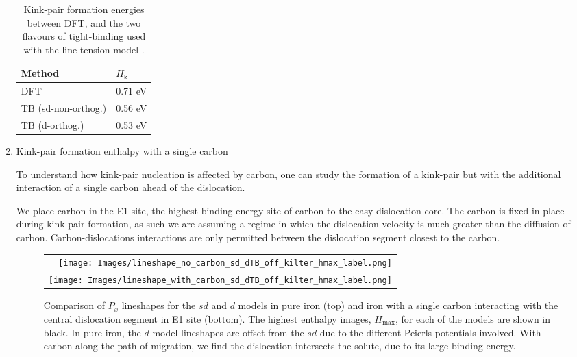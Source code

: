 \documentclass[a4paper,12pt,oneside,print,numbered,index,PageStyleIII]{PhDThesisPSnPDF}
\begin{document}
\begin{enumerate}
\begin{table}[htbp]
\caption{Kink-pair formation energies between DFT, and the two flavours of tight-binding used with the line-tension model \label{kink-pair_formation_enthalpy_pure}.}
\centering
\begin{tabular}{ll}
Method & \(H_{\text{k}}\)\\
\hline
DFT & 0.71 eV\\
TB (sd-non-orthog.) & 0.56 eV\\
TB (d-orthog.) & 0.53 eV\\
\end{tabular}
\end{table}


\item Kink-pair formation enthalpy with a single carbon
\label{sec:org6a61729}

To understand how kink-pair nucleation is affected by carbon, one
can study the formation of a kink-pair but with the
additional interaction of a single carbon ahead of the dislocation.

We place carbon in the E1 site, the highest binding energy site of carbon to
the easy dislocation core. The carbon is fixed in place during kink-pair
formation, as such we are assuming a regime in which the dislocation
velocity is much greater than the diffusion of carbon. Carbon-dislocations
interactions are only permitted between the dislocation segment closest to
the carbon.


    \begin{figure}
\centering
	\begin{tabular}{r}
		      \texttt{[image: Images/lineshape\_no\_carbon\_sd\_dTB\_off\_kilter\_hmax\_label.png]} \\
		      \texttt{[image: Images/lineshape\_with\_carbon\_sd\_dTB\_off\_kilter\_hmax\_label.png]}  \\

		 \end{tabular}
    \caption{ Comparison of $P_x$ lineshapes for the $sd$ and $d$ models in pure iron (top) and iron with a single carbon interacting with the central dislocation segment in E1 site (bottom). The highest enthalpy images, $H_{\text{max}}$, for each of the models are shown in black. In pure iron, the $d$ model lineshapes are offset from the $sd$ due to the different Peierls potentials involved. With carbon along the path of migration, we find the dislocation intersects the solute, due to its large binding energy.}
    \label{fig:alllineshapes}
       \end{figure}



\end{enumerate}
\end{document}
